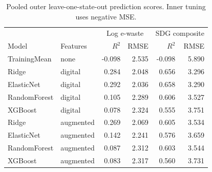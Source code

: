 \begin{table}[htbp]\centering\small
\caption{Pooled outer leave-one-state-out prediction scores. Inner tuning uses negative MSE.}\label{tab:cv}
\begin{tabular}{llrrrr}\toprule & & \multicolumn{2}{c}{Log e-waste} & \multicolumn{2}{c}{SDG composite} \\
Model & Features & $R^2$ & RMSE & $R^2$ & RMSE \\ \midrule
TrainingMean & none & -0.098 & 2.535 & -0.098 & 5.890 \\
Ridge & digital & 0.284 & 2.048 & 0.656 & 3.296 \\
ElasticNet & digital & 0.292 & 2.036 & 0.658 & 3.290 \\
RandomForest & digital & 0.105 & 2.289 & 0.606 & 3.527 \\
XGBoost & digital & 0.078 & 2.324 & 0.555 & 3.751 \\
Ridge & augmented & 0.269 & 2.069 & 0.605 & 3.534 \\
ElasticNet & augmented & 0.142 & 2.241 & 0.576 & 3.659 \\
RandomForest & augmented & 0.087 & 2.312 & 0.603 & 3.544 \\
XGBoost & augmented & 0.083 & 2.317 & 0.560 & 3.731 \\
\bottomrule\end{tabular}\end{table}

